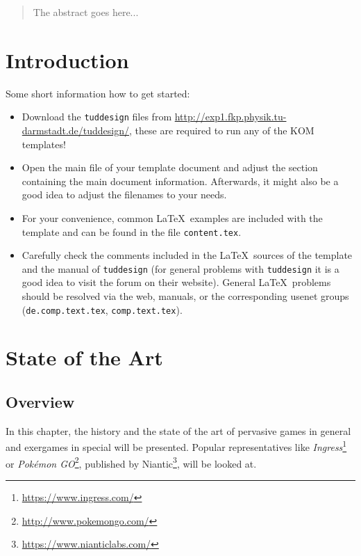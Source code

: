 \begin{abstract}
 The abstract goes here...
\end{abstract}



\chapter{Introduction}
Some short information how to get started:
\begin{itemize}
	\item Download the \texttt{tuddesign} files from \url{http://exp1.fkp.physik.tu-darmstadt.de/tuddesign/}, these are required to run any of the KOM templates!
	\item Open the main file of your template document and adjust the section containing the main document information. Afterwards, it might also be a good idea to adjust the filenames to your needs.
	\item For your convenience, common \LaTeX\ examples are included with the template and can be found in the file \texttt{content.tex}.
	\item Carefully check the comments included in the \LaTeX\ sources of the template and the manual of \texttt{tuddesign} (for general problems with \texttt{tuddesign} it is a good idea to visit the forum on their website). General \LaTeX\ problems should be resolved via the web, manuals, or the corresponding usenet groups (\texttt{de.comp.text.tex}, \texttt{comp.text.tex}).
\end{itemize}



\chapter{State of the Art}\label{ch:stateOfTheArt}
\section{Overview}
In this chapter, the history and the state of the art of pervasive games in general and exergames in special will be presented. Popular representatives like \emph{Ingress}\footnote{\url{https://www.ingress.com/}} or \emph{Pok\'{e}mon GO}\footnote{\url{http://www.pokemongo.com/}}, published by Niantic\footnote{\url{https://www.nianticlabs.com/}}, will be looked at.

